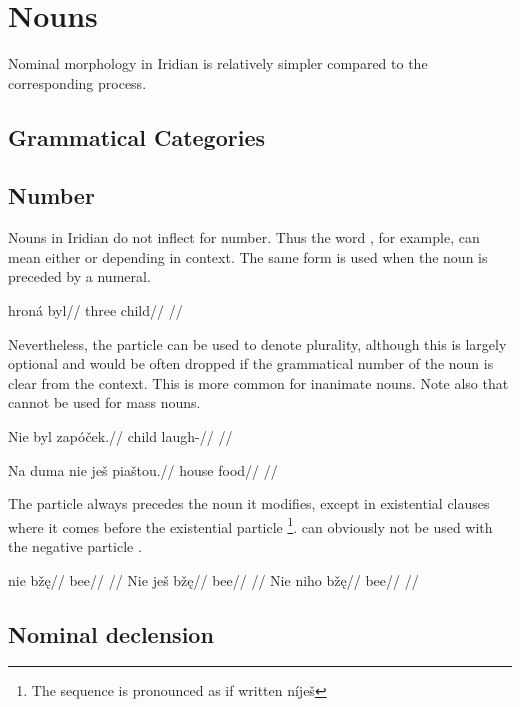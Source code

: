 \chapter{Nouns}

Nominal morphology in Iridian is relatively simpler compared to the corresponding process. 

\section{Grammatical Categories}

\section{Number}

Nouns in Iridian do not inflect for number. Thus the word , for example, can mean either  or  depending in context. The same form is used when the noun is preceded by a numeral.

\pex
\begingl
\gla hron\'a byl//
\glb three child//
\glft {}//
\endgl
\xe

Nevertheless, the particle  can be used to denote plurality, although this is largely optional and would be often dropped if the grammatical number of the noun is clear from the context. This is more common for inanimate nouns. Note also that  cannot be used for mass nouns.

\pex
\begingl
\gla Nie byl zap\'o\v{c}ek.//
\glb {} child laugh-//
\glft {}//
\endgl
\xe

\pex
\begingl
\gla *Na duma nie je\v{s} pia\v{s}tou.//
\glb {} house   food//
\glft {}//
\endgl
\xe

The particle  always precedes the noun it modifies, except in existential clauses where it comes before the existential particle \footnote{The sequence is pronounced as if written n\'ije\v{s} }.  can obviously not be used with the negative particle .

\pex
\a
\begingl
\gla nie b\v{z}\k{e}//
\glb {} bee//
\glft {}//
\endgl
\a
\begingl
\gla Nie je\v{s} b\v{z}\k{e}//
\glb {}  bee//
\glft {}//
\endgl
\a
\begingl
\gla *Nie niho b\v{z}\k{e}//
\glb {}  bee//
\glft {}//
\endgl
\xe


\section{Nominal declension}

